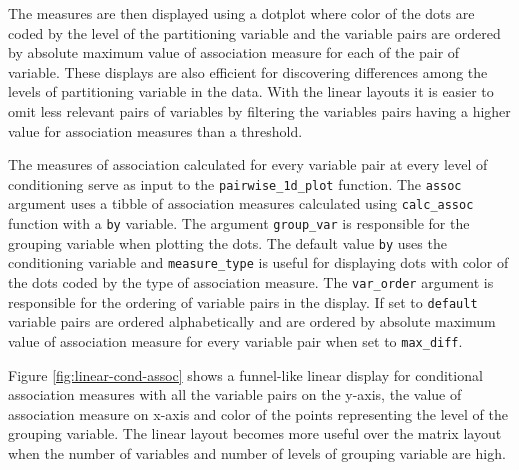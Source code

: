The measures are then displayed using a dotplot where color of the dots
are coded by the level of the partitioning variable and the variable
pairs are ordered by absolute maximum value of association measure for
each of the pair of variable. These displays are also efficient for
discovering differences among the levels of partitioning variable in the
data. With the linear layouts it is easier to omit less relevant pairs
of variables by filtering the variables pairs having a higher value for
association measures than a threshold.

The measures of association calculated for every variable pair at every
level of conditioning serve as input to the \texttt{pairwise\_1d\_plot}
function. The \texttt{assoc} argument uses a tibble of association
measures calculated using \texttt{calc\_assoc} function with a
\texttt{by} variable. The argument \texttt{group\_var} is responsible
for the grouping variable when plotting the dots. The default value
\texttt{by} uses the conditioning variable and \texttt{measure\_type} is
useful for displaying dots with color of the dots coded by the type of
association measure. The \texttt{var\_order} argument is responsible for
the ordering of variable pairs in the display. If set to
\texttt{default} variable pairs are ordered alphabetically and are
ordered by absolute maximum value of association measure for every
variable pair when set to \texttt{max\_diff}.

Figure \ref{fig:linear-cond-assoc} shows a funnel-like linear display
for conditional association measures with all the variable pairs on the
y-axis, the value of association measure on x-axis and color of the
points representing the level of the grouping variable. The linear
layout becomes more useful over the matrix layout when the number of
variables and number of levels of grouping variable are high.

